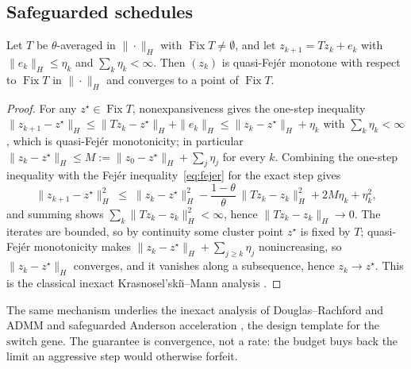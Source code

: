 \subsection{Safeguarded schedules}

\begin{lemma}
\label{lem:safeguard}
Let $T$ be $\theta$-averaged in $\|\cdot\|_H$ with
$\operatorname{Fix}T\neq\emptyset$, and let $z_{k+1}=Tz_k+e_k$ with
$\|e_k\|_H\leq\eta_k$ and $\sum_k\eta_k<\infty$. Then $(z_k)$ is
quasi-Fej\'er monotone with respect to $\operatorname{Fix}T$ in
$\|\cdot\|_H$ and converges to a point of $\operatorname{Fix}T$.
\end{lemma}

\begin{proof}
For any $z^\star\in\operatorname{Fix}T$, nonexpansiveness gives the one-step
inequality
$\|z_{k+1}-z^\star\|_H\leq\|Tz_k-z^\star\|_H+\|e_k\|_H
\leq\|z_k-z^\star\|_H+\eta_k$ with $\sum_k\eta_k<\infty$, which is
quasi-Fej\'er monotonicity; in particular
$\|z_k-z^\star\|_H\leq M:=\|z_0-z^\star\|_H+\sum_j\eta_j$ for every $k$.
Combining the one-step inequality with the Fej\'er
inequality~\eqref{eq:fejer} for the exact step gives
\begin{equation*}
 \|z_{k+1}-z^\star\|_H^2
 \;\leq\;
 \|z_k-z^\star\|_H^2-\frac{1-\theta}{\theta}\,\|Tz_k-z_k\|_H^2
 +2M\eta_k+\eta_k^2 ,
\end{equation*}
and summing shows $\sum_k\|Tz_k-z_k\|_H^2<\infty$, hence
$\|Tz_k-z_k\|_H\to0$. The iterates are bounded, so by continuity some
cluster point $z^\star$ is fixed by $T$; quasi-Fej\'er monotonicity makes
$\|z_k-z^\star\|_H+\sum_{j\geq k}\eta_j$ nonincreasing, so
$\|z_k-z^\star\|_H$ converges, and it vanishes along a subsequence, hence
$z_k\to z^\star$. This is the classical inexact
Krasnosel'ski\u{\i}--Mann analysis
\citep{Combettes2001QuasiFejerian,Combettes2004Solving}.
\end{proof}

The same mechanism underlies the inexact analysis of Douglas--Rachford and
ADMM \citep{EcksteinBertsekas1992Douglas} and safeguarded Anderson
acceleration \citep{Zhang2020Globally}, the design template for the
$\mathrm{switch}$ gene. The guarantee is convergence, not a rate: the budget
buys back the limit an aggressive step would otherwise forfeit.

\FloatBarrier
